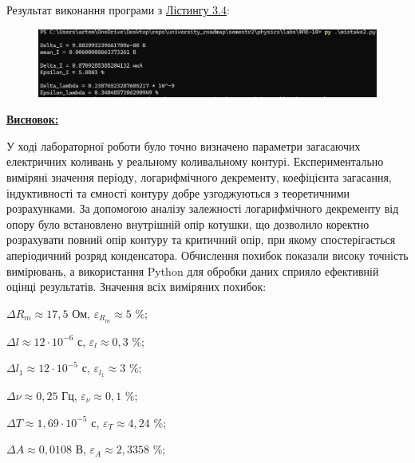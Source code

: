 \documentclass[12pt,a4paper]{article}
\begin{document}
    \newpage

    \setlength{\parindent}{0pt}

    Результат виконання програми з \hyperlink{listing4}{Лістингу 3.4}:

    \begin{figure}[ht]
        \includegraphics[width=1\textwidth]{mistake2_photo.png}
    \end{figure}

    \vspace{3em}

    \underline{\textbf{\large Висновок:}}

    \vspace{1em}

    У ході лабораторної роботи було точно визначено параметри загасаючих електричних коливань у реальному коливальному контурі.
    Експериментально виміряні значення періоду, логарифмічного декременту, коефіцієнта загасання, індуктивності та
    ємності контуру добре узгоджуються з теоретичними розрахунками. За допомогою аналізу залежності логарифмічного
    декременту від опору було встановлено внутрішній опір котушки, що дозволило коректно розрахувати повний опір контуру
    та критичний опір, при якому спостерігається аперіодичний розряд конденсатора.
    Обчислення похибок показали високу точність вимірювань,
    а використання Python для обробки даних сприяло ефективній оцінці результатів. Значення всіх виміряних похибок:

    \vspace{1em}

    $\Delta R_m \approx 17,5$ Ом, $\varepsilon_{R_m} \approx 5$ \%;

    $\Delta l \approx 12 \cdot 10^{-6}$ с, $\varepsilon_l \approx 0,3$ \%;

    $\Delta l_1 \approx 12 \cdot 10^{-5}$ с, $\varepsilon_{l_1} \approx 3$ \%;

    $\Delta \nu \approx 0,25$ Гц, $\varepsilon_{\nu} \approx 0,1$ \%;

    $\Delta T \approx 1,69 \cdot 10^{-5}$ с, $\varepsilon_T \approx 4,24$ \%;

    $\Delta A \approx 0,0108$ В, $\varepsilon_A \approx 2,3358$ \%;
\end{document}
